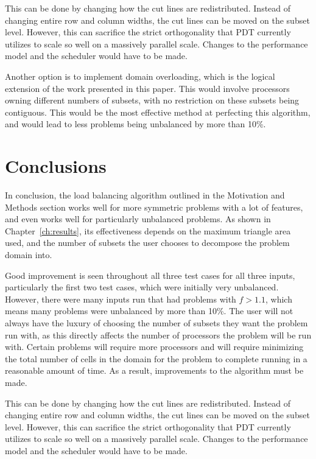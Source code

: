 \documentclass{anstrans}
\begin{document}
This can be done by changing how the cut lines are redistributed. Instead of changing entire row and column widths, the cut lines can be moved on the subset level. However, this can sacrifice the strict orthogonality that PDT currently utilizes to scale so well on a massively parallel scale. Changes to the performance model and the scheduler would have to be made.

Another option is to implement domain overloading, which is the logical extension of the work presented in this paper. This would involve processors owning different numbers of subsets, with no restriction on these subsets being contiguous. This would be the most effective method at perfecting this algorithm, and would lead to less problems being unbalanced by more than 10\%.

\section{Conclusions}

In conclusion, the load balancing algorithm outlined in the Motivation and Methods section works well for more symmetric problems with a lot of features, and even works well for particularly unbalanced problems. As shown in Chapter~\ref{ch:results}, its effectiveness depends on the maximum triangle area used, and the number of subsets the user chooses to decompose the problem domain into. 

Good improvement is seen throughout all three test cases for all three inputs, particularly the first two test cases, which were initially very unbalanced. However, there were many inputs run that had problems with $f > 1.1$, which means many problems were unbalanced by more than 10\%. The user will not always have the luxury of choosing the number of subsets they want the problem run with, as this directly affects the number of processors the problem will be run with. Certain problems will require more processors and will require minimizing the total number of cells in the domain for the problem to complete running in a reasonable amount of time. As a result, improvements to the algorithm must be made. 

This can be done by changing how the cut lines are redistributed. Instead of changing entire row and column widths, the cut lines can be moved on the subset level. However, this can sacrifice the strict orthogonality that PDT currently utilizes to scale so well on a massively parallel scale. Changes to the performance model and the scheduler would have to be made.
\end{document}

